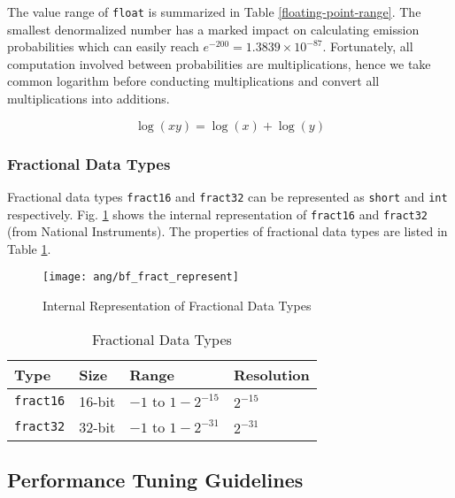 The value range of \texttt{float} is summarized in Table \ref{floating-point-range}. The smallest denormalized number has a marked impact on calculating emission probabilities which can easily reach $e^{-200} = 1.3839 \times 10^{-87}$. Fortunately, all computation involved between probabilities are multiplications, hence we take common logarithm before conducting multiplications and convert all multiplications into additions.

\begin{equation}
\log(xy) = \log(x) + \log(y)
\end{equation}


\subsubsection{Fractional Data Types}

Fractional data types \texttt{fract16} and \texttt{fract32} can be represented as \texttt{short} and \texttt{int} respectively. Fig. \ref{bf_fract_represent} shows the internal representation of \texttt{fract16} and \texttt{fract32} (from National Instruments). The properties of fractional data types are listed in Table \ref{fractional-data-types}.

\begin{figure}[H]
\centering
\texttt{[image: ang/bf\_fract\_represent]}
\caption{Internal Representation of Fractional Data Types}
\label{bf_fract_represent}
\end{figure}

\begin{table}[H]
\centering
\begin{tabu} to \textwidth {XXXX}
\toprule
Type &Size &Range &Resolution\\
\hline
\texttt{fract16} &16-bit &$-1$ to $1 - 2^{-15}$ &$2^{-15}$\\
\hline
\texttt{fract32} &32-bit &$-1$ to $1 - 2^{-31}$ &$2^{-31}$\\
\bottomrule
\end{tabu}
\caption{Fractional Data Types}
\label{fractional-data-types}
\end{table}


\subsection{Performance Tuning Guidelines}

